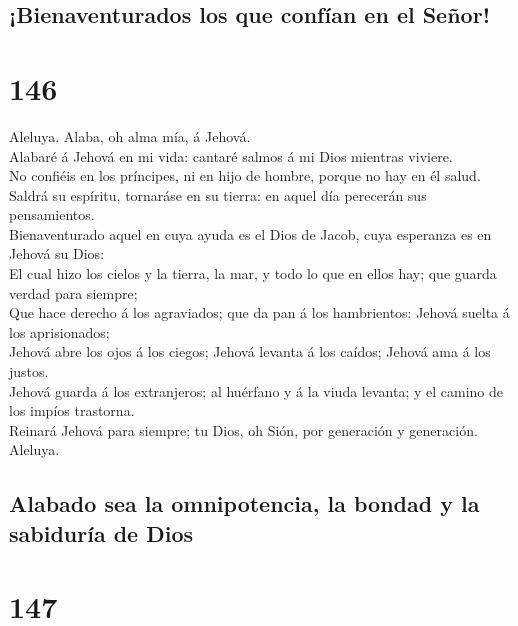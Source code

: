 \hypertarget{bienaventurados-los-que-confuxedan-en-el-seuxf1or}{%
\subsection{¡Bienaventurados los que confían en el
Señor!}\label{bienaventurados-los-que-confuxedan-en-el-seuxf1or}}

\hypertarget{section-145}{%
\section{146}\label{section-145}}

 Aleluya. Alaba, oh alma mía, á Jehová.\\
 Alabaré á Jehová en mi vida: cantaré salmos á mi Dios
mientras viviere.\\
 No confiéis en los príncipes, ni en hijo de hombre, porque
no hay en él salud.\\
 Saldrá su espíritu, tornaráse en su tierra: en aquel día
perecerán sus pensamientos.\\
 Bienaventurado aquel en cuya ayuda es el Dios de Jacob,
cuya esperanza es en Jehová su Dios:\\
 El cual hizo los cielos y la tierra, la mar, y todo lo que
en ellos hay; que guarda verdad para siempre;\\
 Que hace derecho á los agraviados; que da pan á los
hambrientos: Jehová suelta á los aprisionados;\\
 Jehová abre los ojos á los ciegos; Jehová levanta á los
caídos; Jehová ama á los justos.\\
 Jehová guarda á los extranjeros; al huérfano y á la viuda
levanta; y el camino de los impíos trastorna.\\
 Reinará Jehová para siempre; tu Dios, oh Sión, por
generación y generación. Aleluya.

\hypertarget{alabado-sea-la-omnipotencia-la-bondad-y-la-sabiduruxeda-de-dios}{%
\subsection{Alabado sea la omnipotencia, la bondad y la sabiduría de
Dios}\label{alabado-sea-la-omnipotencia-la-bondad-y-la-sabiduruxeda-de-dios}}

\hypertarget{section-146}{%
\section{147}\label{section-146}}

